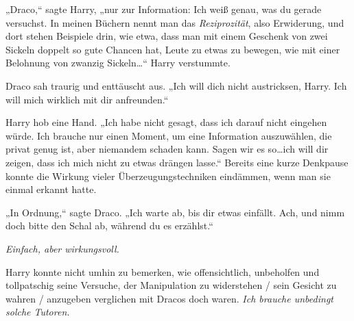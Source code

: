 „Draco,“ sagte Harry, „nur zur Information: Ich weiß genau, was du gerade versuchst. In meinen Büchern nennt man das \emph{Reziprozität}, also Erwiderung, und dort stehen Beispiele drin, wie etwa, dass man mit einem Geschenk von zwei Sickeln doppelt so gute Chancen hat, Leute zu etwas zu bewegen, wie mit einer Belohnung von zwanzig Sickeln…“ Harry verstummte.

Draco sah traurig und enttäuscht aus. „Ich will dich nicht austricksen, Harry. Ich will mich wirklich mit dir anfreunden.“

Harry hob eine Hand. „Ich habe nicht gesagt, dass ich darauf nicht eingehen würde. Ich brauche nur einen Moment, um eine Information auszuwählen, die privat genug ist, aber niemandem schaden kann. Sagen wir es so…ich will dir zeigen, dass ich mich nicht zu etwas drängen lasse.“ Bereits eine kurze Denkpause konnte die Wirkung vieler Überzeugungstechniken eindämmen, wenn man sie einmal erkannt hatte.

„In Ordnung,“ sagte Draco. „Ich warte ab, bis dir etwas einfällt. Ach, und nimm doch bitte den Schal ab, während du es erzählst.“

\emph{Einfach, aber wirkungsvoll.}

Harry konnte nicht umhin zu bemerken, wie offensichtlich, unbeholfen und tollpatschig seine Versuche, der Manipulation zu widerstehen / sein Gesicht zu wahren / anzugeben verglichen mit Dracos doch waren. \emph{Ich brauche unbedingt solche Tutoren.}

